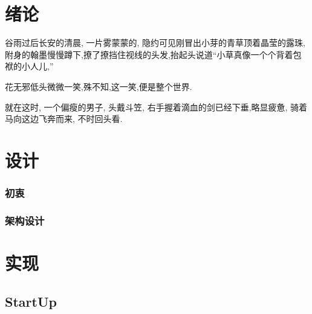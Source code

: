 
\iffalse
\fi


\chapter{绪论}

谷雨过后长安的清晨, 一片雾蒙蒙的, 
隐约可见刚冒出小芽的青草顶着晶莹的露珠,
附身的翰墨慢慢蹲下,撩了撩挡住视线的头发,抬起头说道“小草真像一个个背着包袱的小人儿,”

花无邪低头微微一笑,殊不知,这一笑,便是整个世界.

就在这时, 一个偏瘦的男子, 头戴斗笠, 右手握着滴血的剑已经下垂,略显疲惫, 骑着马向这边飞奔而来, 不时回头看.


\chapter{设计}
\subsection{初衷}
\subsection{架构设计}

\chapter{实现}

\section{StartUp}
